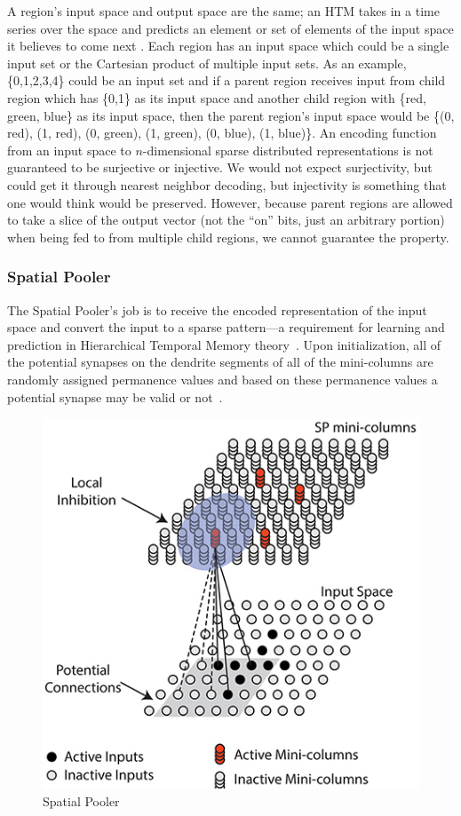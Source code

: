 \documentclass[oneside,12pt,openany]{book}
\begin{document}
	A region's input space and output space are the same; an HTM takes in a time series over the space and predicts an element or set of elements of the input space it believes to come next \cite{Purdy}. Each region has an input space which could be a single input set or the Cartesian product of multiple input sets. As an example, \{0,1,2,3,4\} could be an input set and if a parent region receives input from child region which has \{0,1\} as its input space and another child region with \{red, green, blue\} as its input space, then the parent region's input space would be \{(0, red), (1, red), (0, green), (1, green), (0, blue), (1, blue)\}. An encoding function from an input space to $n$-dimensional sparse distributed representations is not guaranteed to be surjective or injective. We would not expect surjectivity, but could get it through nearest neighbor decoding, but injectivity is something that one would think would be preserved. However, because parent regions are allowed to take a slice of the output vector (not the ``on'' bits, just an arbitrary portion) when being fed to from multiple child regions, we cannot guarantee the property.
	
	\subsubsection{Spatial Pooler}

	The Spatial Pooler's job is to receive the encoded representation of the input space and convert the input to a sparse pattern---a requirement for learning and prediction in Hierarchical Temporal Memory theory~\cite{Whitepaper}. Upon initialization, all of the potential synapses on the dendrite segments of all of the mini-columns are randomly assigned permanence values and based on these permanence values a potential synapse may be valid or not~\cite{Whitepaper}. 

	\begin{figure}[hbt!]
		\centering
		\includegraphics[width=.6\linewidth]{images/SpatialPooler.jpg}
		\caption[Spatial Pooler]{Spatial Pooler \cite{TheHTMSpatialPooler}}
		\label{fig:SpatialPooler}
	\end{figure}
\end{document}
